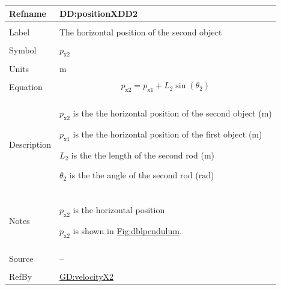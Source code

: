 \documentclass[12pt]{article}
\begin{document}
\vspace{\baselineskip}
\noindent
\begin{minipage}{\textwidth}
\begin{tabular}{>{\raggedright}p{}>{\raggedright\arraybackslash}p{}}
\toprule \textbf{Refname} & \textbf{DD:positionXDD2}
\label{DD:positionXDD2}
\\ \midrule \\
Label & The horizontal position of the second object
        
\\ \midrule \\
Symbol & ${p_{\text{x}2}}$
         
\\ \midrule \\
Units & ${\text{m}}$
        
\\ \midrule \\
Equation & \begin{displaymath}
           {p_{\text{x}2}}={p_{\text{x}1}}+{L_{2}} \sin\left({θ_{2}}\right)
           \end{displaymath}
\\ \midrule \\
Description & \begin{symbDescription}
              \item{${p_{\text{x}2}}$ is the the horizontal position of the second object (${\text{m}}$)}
              \item{${p_{\text{x}1}}$ is the the horizontal position of the first object (${\text{m}}$)}
              \item{${L_{2}}$ is the the length of the second rod (${\text{m}}$)}
              \item{${θ_{2}}$ is the the angle of the second rod (${\text{rad}}$)}
              \end{symbDescription}
\\ \midrule \\
Notes & ${p_{\text{x}2}}$ is the horizontal position
        
        ${p_{\text{x}2}}$ is shown in \hyperref[Figure:dblpendulum]{Fig:dblpendulum}.
        
\\ \midrule \\
Source & --
         
\\ \midrule \\
RefBy & \hyperref[GD:velocityX2]{GD:velocityX2}
        
\\ \bottomrule
\end{tabular}
\end{minipage}
\end{document}
